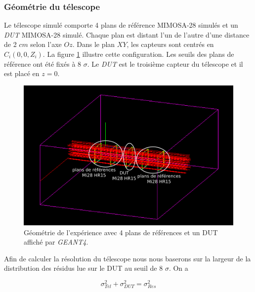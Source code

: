      
    \subsubsection{G\'eom\'etrie du t\'elescope}  
   
   Le t\'elescope simul\'e comporte 4 plans de r\'ef\'erence MIMOSA-28 simul\'es et un \textit{DUT} MIMOSA-28 simul\'e. Chaque plan est distant l'un de l'autre d'une distance de 2 $cm$ selon l'axe $Oz$. Dans le plan $XY$, les capteurs sont centr\'es en $C_i(0,0,Z_i)$. La figure \ref{fig:geom_thr} illustre cette configuration. Les seuils des plans de r\'ef\'erence ont \'et\'e fix\'es \`a 8 $\sigma$. Le \textit{DUT} est le troisi\`eme capteur du t\'elescope et il est plac\'e en $z=0$.
   
   \begin{figure}[!htb]
    \begin{center} 
     \includegraphics[scale=0.70]{./figures/geometrie_etude_thr.png}
     \caption{G\'eom\'etrie de l'exp\'erience avec 4 plans de r\'ef\'erences et un DUT affich\'e par \textit{GEANT4}.}
     \label{fig:geom_thr}
   \end{center}
   \end{figure}  
   
   \medskip
   
   Afin de calculer la r\'esolution du t\'elescope nous nous baserons sur la largeur de la distribution des r\'esidus lue sur le DUT au seuil de 8 $\sigma$. On a
   
   \begin{equation}
    \sigma_{Tel}^2 + \sigma_{DUT}^2 = \sigma_{Res}^2
   \end{equation}


